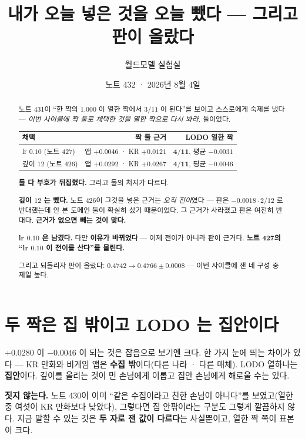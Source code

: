 \documentclass[11pt]{article}
\begin{document}
\title{내가 오늘 넣은 것을 오늘 뺐다 --- 그리고 판이 올랐다}
\author{월드모델 실험실}
\date{노트 432 · 2026년 8월 4일}
\maketitle

\begin{abstract}
노트 431이 ``한 짝의 $1.000$ 이 열한 짝에서 $3/11$ 이 된다''를 보이고
스스로에게 숙제를 냈다 --- \emph{이번 사이클에 짝 둘로 채택한 것을 열한 짝으로
다시 봐라.} 둘이었다.

\begin{center}
\begin{tabular}{lrr}
\hline
채택 & 짝 둘 근거 & LODO 열한 짝 \\
\hline
lr $0.10$ (노트 427) & 앱 $+0.0046$ · KR $+0.0121$ & $\mathbf{4/11}$, 평균 $-0.0031$ \\
깊이 $12$ (노트 426) & 앱 $+0.0292$ · KR $+0.0267$ & $\mathbf{4/11}$, 평균 $-0.0046$ \\
\hline
\end{tabular}
\end{center}

\textbf{둘 다 부호가 뒤집혔다.} 그리고 둘의 처지가 다르다.

\textbf{깊이 $12$ 는 뺐다.} 노트 426이 그것을 넣은 근거는 \emph{오직 전이}였다
--- 판은 $-0.0018 \cdot 2/12$ 로 반대했는데 안 본 도메인 둘이 확실히 샀기
때문이었다. 그 근거가 사라졌고 판은 여전히 반대다. \textbf{근거가 없으면
빼는 것이 맞다.}

\textbf{lr $0.10$ 은 남겼다.} 다만 \textbf{이유가 바뀌었다} --- 이제 전이가
아니라 판이 근거다. \textbf{노트 427의 ``lr $0.10$ 이 전이를 산다''를
물린다.}

그리고 되돌리자 판이 올랐다: $0.4742 \to \mathbf{0.4766 \pm 0.0008}$ ---
이번 사이클에 잰 네 구성 중 제일 높다.
\end{abstract}

\section{두 짝은 집 밖이고 LODO 는 집안이다}

$+0.0280$ 이 $-0.0046$ 이 되는 것은 잡음으로 보기엔 크다. 한 가지 눈에
띄는 차이가 있다 --- KR 만화와 비게임 앱은 \textbf{수집 밖}이다(다른 나라 ·
다른 매체). LODO 열하나는 \textbf{집안}이다. 깊이를 올리는 것이 먼 손님에게
이롭고 집안 손님에게 해로울 수는 있다.

\textbf{짓지 않는다.} 노트 430이 이미 ``같은 수집이라고 친한 손님이 아니다''를
보였고(열한 중 여섯이 KR 만화보다 낮았다), 그렇다면 집 안팎이라는 구분도
그렇게 깔끔하지 않다. 지금 말할 수 있는 것은 \textbf{두 자로 잰 값이 다르다}는
사실뿐이고, 열한 짝 쪽이 표본이 크다.
\end{document}
